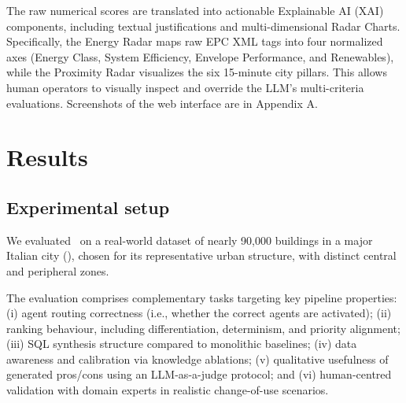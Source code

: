 \documentclass[runningheads,orivec]{llncs}
\begin{document}
The raw numerical scores are translated into actionable Explainable AI (XAI) components, including textual justifications and multi-dimensional Radar Charts. Specifically, the Energy Radar maps raw EPC XML tags into four normalized axes (Energy Class, System Efficiency, Envelope Performance, and Renewables), while the Proximity Radar visualizes the six 15-minute city pillars. This allows human operators to visually inspect and override the LLM's multi-criteria evaluations.
Screenshots of the web interface are in Appendix A.


\section{Results}
\label{sec:results}



\subsection{Experimental setup}
\label{sec:setup}

We evaluated \methodACR\ on a real-world dataset of nearly 90,000 buildings in a major Italian city (), chosen for its representative urban structure, with distinct central and peripheral zones.

The evaluation comprises complementary tasks targeting key pipeline properties: (i) agent routing correctness (i.e., whether the correct agents are activated); (ii) ranking behaviour, including differentiation, determinism, and priority alignment; (iii) SQL synthesis structure compared to monolithic baselines; (iv) data awareness and calibration via knowledge ablations; (v) qualitative usefulness of generated pros/cons using an LLM-as-a-judge protocol; and (vi) human-centred validation with domain experts in realistic change-of-use scenarios.
\end{document}
